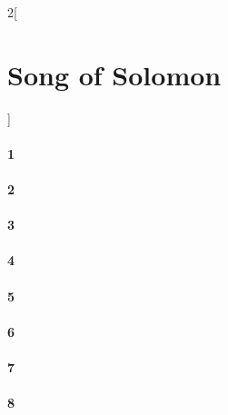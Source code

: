 \documentclass{book}
\begin{document}
\begin{multicols}{2}[\part{Song of Solomon}]
\subsection*{1}
\subsection*{2}
\subsection*{3}
\subsection*{4}
\subsection*{5}
\subsection*{6}
\subsection*{7}
\subsection*{8}
\end{multicols}
\end{document}
